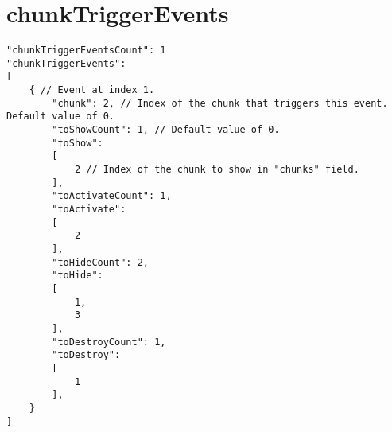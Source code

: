 \documentclass[10pt,a4paper]{article}
\begin{document}
\section{chunkTriggerEvents}
\begin{lstlisting}
"chunkTriggerEventsCount": 1
"chunkTriggerEvents":
[
	{ // Event at index 1.
		"chunk": 2, // Index of the chunk that triggers this event. Default value of 0.
		"toShowCount": 1, // Default value of 0.
		"toShow":
		[
			2 // Index of the chunk to show in "chunks" field.
		],
		"toActivateCount": 1,
		"toActivate":
		[
			2		
		],
		"toHideCount": 2,
		"toHide":
		[
			1,
			3		
		],
		"toDestroyCount": 1,
		"toDestroy":
		[
			1
		],
	}
]
\end{lstlisting}
\end{document}
